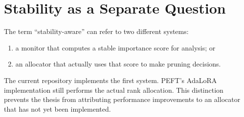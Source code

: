\section{Stability as a Separate Question}

The term ``stability-aware'' can refer to two different systems:
\begin{enumerate}
  \item a monitor that computes a stable importance score for analysis; or
  \item an allocator that actually uses that score to make pruning decisions.
\end{enumerate}
The current repository implements the first system. PEFT's AdaLoRA implementation still performs
the actual rank allocation. This distinction prevents the thesis from attributing performance
improvements to an allocator that has not yet been implemented.
